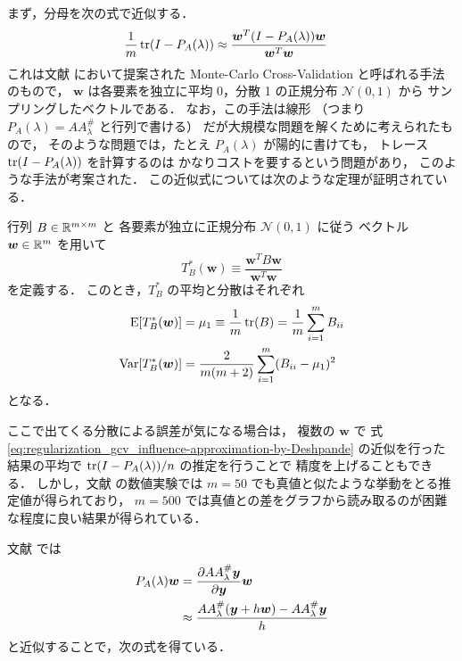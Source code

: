 まず，分母を次の式で近似する．
\begin{align}
    \frac{1}{m} \operatorname{tr}(I - P_A(\lambda))
     & \approx \frac{\bm{w}^T (I - P_A(\lambda)) \bm{w}}{\bm{w}^T \bm{w}}
    \label{eq:regularization_gcv_influence-approximation-by-Deshpande}
\end{align}
これは文献 \cite{Girard1989} において提案された
Monte-Carlo Cross-Validation と呼ばれる手法のもので，
$\bm{w}$ は各要素を独立に平均 0，分散 1 の正規分布 $\mathcal{N}(0,1)$ から
サンプリングしたベクトルである．
なお，この手法は線形
（つまり $P_A(\lambda) = A A_\lambda^\#$ と行列で書ける）
だが大規模な問題を解くために考えられたもので，
そのような問題では，たとえ $P_A(\lambda)$ が陽的に書けても，
トレース $\operatorname{tr}(I - P_A(\lambda))$ を計算するのは
かなりコストを要するという問題があり，
このような手法が考案された．
この近似式については次のような定理が証明されている．

\begin{theorem}
    行列 $B \in \mathbb{R}^{m \times m}$ と
    各要素が独立に正規分布 $\mathcal{N}(0,1)$ に従う
    ベクトル $\bm{w} \in \mathbb{R}^m$ を用いて
    \begin{equation}
        T_B^*(\bm{w}) \equiv \frac{\bm{w}^T B \bm{w}}{\bm{w}^T \bm{w}}
    \end{equation}
    を定義する．
    このとき，$T_B^*$ の平均と分散はそれぞれ
    \begin{align}
        \mathrm{E}[T_B^*(\bm{w})]   & =\mu_1 \equiv \frac{1}{m} \operatorname{tr}(B) = \frac{1}{m} \sum_{i=1}^m B_{ii}
        \\
        \mathrm{Var}[T_B^*(\bm{w})] & =\frac{2}{m (m + 2)} \sum_{i=1}^m (B_{ii} - \mu_1)^2
    \end{align}
    となる．
\end{theorem}

ここで出てくる分散による誤差が気になる場合は，
複数の $\bm{w}$ で
式 \eqref{eq:regularization_gcv_influence-approximation-by-Deshpande} の近似を行った
結果の平均で $\operatorname{tr}(I-P_A(\lambda))/n$ の推定を行うことで
精度を上げることもできる．
しかし，文献 \cite{Girard1989} の数値実験では
$m=50$ でも真値と似たような挙動をとる推定値が得られており，
$m=500$ では真値との差をグラフから読み取るのが困難な程度に良い結果が得られている．

文献 \cite{Deshpande1991} では
\begin{align}
    P_A(\lambda) \bm{w}
     & = \frac{\partial A A_\lambda^\# \bm{y}}{\partial \bm{y}} \bm{w}
    \notag                                                                   \\
     & \approx \frac{AA_\lambda^\#(\bm{y}+h\bm{w}) - AA_\lambda^\#\bm{y}}{h}
\end{align}
と近似することで，次の式を得ている．

